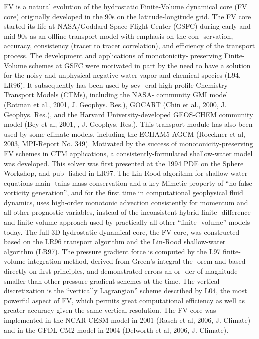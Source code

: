 FV\textthreesuperior{} is a natural evolution of the hydrostatic Finite-\/\+Volume dynamical core (FV core) originally developed in the 90s on the latitude-\/longitude grid. The FV core started its life at N\+A\+S\+A/\+Goddard Space Flight Center (G\+S\+FC) during early and mid 90s as an offline transport model with emphasis on the con-\/ servation, accuracy, consistency (tracer to tracer correlation), and efficiency of the transport process. The development and applications of monotonicity-\/ preserving Finite-\/\+Volume schemes at G\+S\+FC were motivated in part by the need to have a solution for the noisy and unphysical negative water vapor and chemical species (L94, L\+R96). It subsequently has been used by sev-\/ eral high-\/profile Chemistry Transport Models (C\+T\+Ms), including the N\+A\+S\+A-\/ community G\+MI model (Rotman et al., 2001, J. Geophys. Res.), G\+O\+C\+A\+RT (Chin et al., 2000, J. Geophys. Res.), and the Harvard University-\/developed G\+E\+O\+S-\/\+C\+H\+EM community model (Bey et al, 2001, , J. Geophys. Res.). This transport module has also been used by some climate models, including the E\+C\+H\+A\+M5 A\+G\+CM (Roeckner et al, 2003, M\+P\+I-\/\+Report No. 349). Motivated by the success of monotonicity-\/preserving FV schemes in C\+TM applications, a consistently-\/formulated shallow-\/water model was developed. This solver was first presented at the 1994 P\+DE on the Sphere Workshop, and pub-\/ lished in L\+R97. The Lin-\/\+Rood algorithm for shallow-\/water equations main-\/ tains mass conservation and a key Mimetic property of “no false vorticity generation”, and for the first time in computational geophysical fluid dynamics, uses high-\/order monotonic advection consistently for momentum and all other prognostic variables, instead of the inconsistent hybrid finite-\/ difference and finite-\/volume approach used by practically all other “finite-\/ volume” models today. The full 3D hydrostatic dynamical core, the FV core, was constructed based on the L\+R96 transport algorithm and the Lin-\/\+Rood shallow-\/water algorithm (L\+R97). The pressure gradient force is computed by the L97 finite-\/volume integration method, derived from Green’s integral the-\/ orem and based directly on first principles, and demonstrated errors an or-\/ der of magnitude smaller than other pressure-\/gradient schemes at the time. The vertical discretization is the “vertically Lagrangian” scheme described by L04, the most powerful aspect of FV\textthreesuperior{}, which permits great computational efficiency as well as greater accuracy given the same vertical resolution. The FV core was implemented in the N\+C\+AR C\+E\+SM model in 2001 (Rasch et al, 2006, J. Climate) and in the G\+F\+DL C\+M2 model in 2004 (Delworth et al, 2006, J. Climate).

